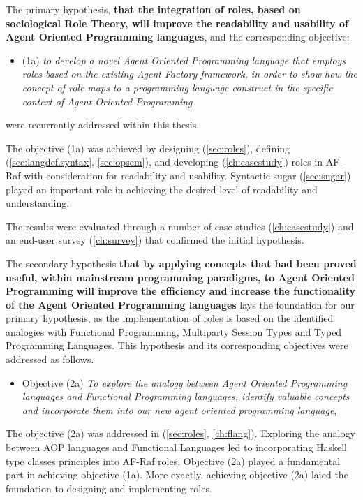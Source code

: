 \documentclass[a4paper,12pt,oneside,fleqn]{book} %
\begin{document}
{The primary hypothesis, \textbf{that the integration of roles, based on
sociological Role Theory, will improve the readability and usability of
Agent Oriented Programming languages}, and the corresponding objective:

\begin{itemize}
  \item (1a) \textit{to develop a novel Agent Oriented Programming language that employs roles based on the existing Agent Factory framework, in order to show how the concept of role maps to a programming language construct in the specific context of Agent Oriented Programming} 
\end{itemize}
were recurrently addressed within this thesis. 

The objective (1a) was achieved by designing (\autoref{sec:roles}),
defining (\autoref{sec:langdef.syntax}, \autoref{sec:opsem}), and
developing (\autoref{ch:casestudy}) roles in AF-Raf with consideration for
readability and usability. Syntactic sugar (\autoref{sec:sugar}) played an
important role in achieving the desired level of readability and
understanding.

The results were evaluated through a number of case
studies (\autoref{ch:casestudy}) and an end-user
survey (\autoref{ch:survey}) that confirmed the initial hypothesis.

The secondary hypothesis \textbf{that by applying concepts
that had been proved useful, within mainstream programming paradigms, to
Agent Oriented Programming will improve the efficiency and increase
the functionality of the Agent Oriented Programming languages} lays the
foundation for our primary hypothesis, as the implementation of roles is
based on the identified analogies with Functional Programming, Multiparty
Session Types and Typed Programming Languages. This hypothesis and its
corresponding objectives were addressed as follows.

\begin{itemize}
  \item Objective (2a) \textit{To explore the analogy between Agent
    Oriented Programming languages and Functional Programming languages,
    identify valuable concepts and incorporate them into our new agent
  oriented programming language}, 
\end{itemize}
  
The objective (2a) was addressed in (\autoref{sec:roles},
\autoref{ch:flang}). Exploring the analogy between AOP languages and
Functional Languages led to incorporating Haskell type classes principles
into AF-Raf roles. Objective (2a) played a fundamental part in achieving
objective (1a). More exactly, achieving objective (2a) laied the foundation
to designing and implementing roles. 

}
\end{document}
